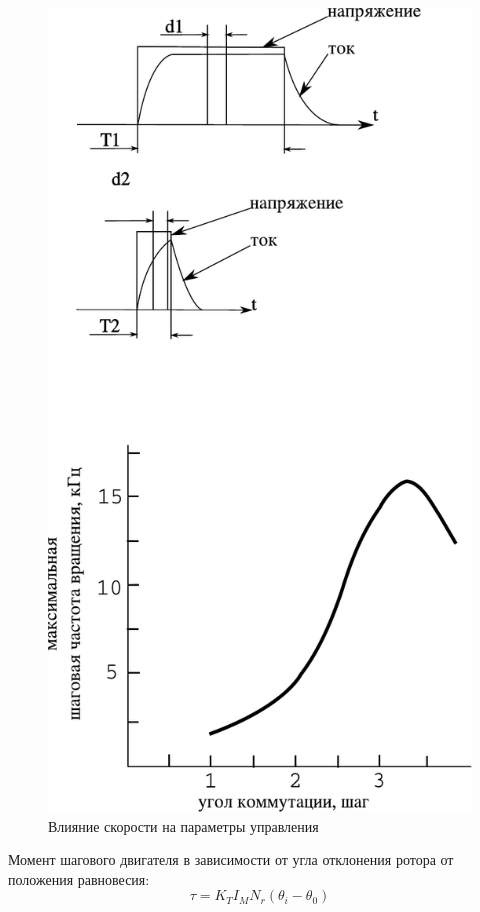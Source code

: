 \begin{figure}
\centering
\includegraphics[width=121mm, keepaspectratio]{./src/pictures/max_step_motor_by_com_angle}
\caption{Влияние скорости на параметры управления}
\label{graph_speed_and_angle_comutation}
\end{figure}

Момент шагового двигателя в зависимости от угла отклонения ротора от положения равновесия:
\begin{equation}
    \label{torque_from_rotor_deviation}
    \tau = K_{T} I_{M} N_{r} ( \theta_{i} - \theta_{0} )
\end{equation}

